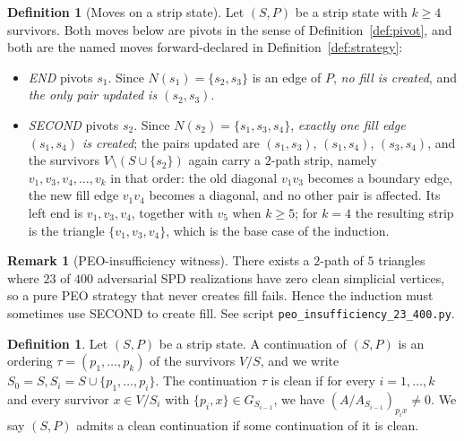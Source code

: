\documentclass[11pt]{article}
\theoremstyle{plain}
\theoremstyle{definition}
\newtheorem{definition}[theorem]{Definition}
\newtheorem{remark}[theorem]{Remark}
\begin{document}
\begin{aiblock}
\begin{definition}[Moves on a strip state]\label{def:strip-moves}
Let $(S,P)$ be a strip state with $k\ge4$ survivors. Both moves below are pivots in the sense of
Definition~\ref{def:pivot}, and both are the named moves forward-declared in
Definition~\ref{def:strategy}:
\begin{itemize}
\item \emph{END} pivots $s_1$. Since $N(s_1)=\{s_2,s_3\}$ is an edge of $P$, \emph{no fill is created}, and \emph{the only pair updated is $(s_2,s_3)$}.
\item \emph{SECOND} pivots $s_2$. Since $N(s_2)=\{s_1,s_3,s_4\}$, \emph{exactly one fill edge $(s_1,s_4)$ is created}; the pairs updated are $(s_1,s_3)$, $(s_1,s_4)$, $(s_3,s_4)$, and the survivors $V\setminus(S\cup\{s_2\})$ again carry a $2$-path strip, namely $v_1,v_3,v_4,\dots,v_k$ in that order: the old diagonal $v_1v_3$ becomes a boundary edge, the new fill edge $v_1v_4$ becomes a diagonal, and no other pair is affected. Its left end is $v_1,v_3,v_4$, together with $v_5$ when $k\ge5$; for $k=4$ the resulting strip is the triangle $\{v_1,v_3,v_4\}$, which is the base case of the induction.
\end{itemize}
\end{definition}

\begin{remark}[PEO-insufficiency witness]\label{rem:peo-fail}
There exists a $2$-path of $5$ triangles where $23$ of $400$ adversarial SPD realizations have zero clean simplicial vertices, so a pure PEO strategy that never creates fill fails. Hence the induction must sometimes use SECOND to create fill. See script \texttt{peo\_insufficiency\_23\_400.py}.
\end{remark}

\begin{definition}\label{def:clean_continuation}
    Let $(S, P)$ be a strip state. A continuation of $(S, P)$ is an ordering $\tau = (p_1,\dots, p_k)$ of the survivors $V\slash S$, and we write $S_0 = S, S_i = S \cup \{p_1, \dots, p_i\}$. The continuation $\tau$ is clean if for every $i = 1, \dots, k$ and every survivor $x \in V\slash S_i$ with $\{p_i, x\} \in G_{S_{i-1}}$, we have $(A / A_{S_{i-1}})_{p_i x} \neq 0$. We say $(S, P)$ admits a clean continuation if some continuation of it is clean.
\end{definition}


\end{aiblock}
\end{document}
